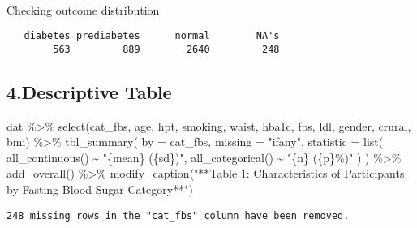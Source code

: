 \documentclass[
  letterpaper,
  DIV=11,
  numbers=noendperiod]{scrartcl}
\makeatletter
\let\oldparagraph\paragraph
\renewcommand{\paragraph}{
    \@ifstar
      \xxxParagraphStar
      \xxxParagraphNoStar
  }
\newcommand{\xxxParagraphStar}[1]{\oldparagraph*{#1}\mbox{}}
\newcommand{\xxxParagraphNoStar}[1]{\oldparagraph{#1}\mbox{}}
\newenvironment{Shaded}{\begin{snugshade}}{\end{snugshade}}
\newcommand{\AttributeTok}[1]{\textcolor[rgb]{0.40,0.45,0.13}{#1}}
\newcommand{\FunctionTok}[1]{\textcolor[rgb]{0.28,0.35,0.67}{#1}}
\newcommand{\NormalTok}[1]{\textcolor[rgb]{0.00,0.23,0.31}{#1}}
\newcommand{\SpecialCharTok}[1]{\textcolor[rgb]{0.37,0.37,0.37}{#1}}
\newcommand{\StringTok}[1]{\textcolor[rgb]{0.13,0.47,0.30}{#1}}
\makeatother
\begin{document}
\paragraph{Checking outcome
distribution}\label{checking-outcome-distribution}

\begin{Shaded}
\end{Shaded}

\begin{verbatim}
   diabetes prediabetes      normal        NA's 
        563         889        2640         248 
\end{verbatim}

\subsection{4.Descriptive Table}\label{descriptive-table}

\begin{Shaded}
\begin{Highlighting}[]
\NormalTok{dat }\SpecialCharTok{\%\textgreater{}\%}
  \FunctionTok{select}\NormalTok{(cat\_fbs, age, hpt, smoking, waist, hba1c, fbs, ldl,}
\NormalTok{         gender, crural, bmi) }\SpecialCharTok{\%\textgreater{}\%}
  \FunctionTok{tbl\_summary}\NormalTok{(}
    \AttributeTok{by =}\NormalTok{ cat\_fbs,}
    \AttributeTok{missing =} \StringTok{"ifany"}\NormalTok{,}
    \AttributeTok{statistic =} \FunctionTok{list}\NormalTok{(}
      \FunctionTok{all\_continuous}\NormalTok{() }\SpecialCharTok{\textasciitilde{}} \StringTok{"\{mean\} (\{sd\})"}\NormalTok{,}
      \FunctionTok{all\_categorical}\NormalTok{() }\SpecialCharTok{\textasciitilde{}} \StringTok{"\{n\} (\{p\}\%)"}
\NormalTok{    )}
\NormalTok{  ) }\SpecialCharTok{\%\textgreater{}\%}
  \FunctionTok{add\_overall}\NormalTok{() }\SpecialCharTok{\%\textgreater{}\%}
  \FunctionTok{modify\_caption}\NormalTok{(}\StringTok{"**Table 1: Characteristics of Participants by Fasting Blood Sugar Category**"}\NormalTok{)}
\end{Highlighting}
\end{Shaded}

\begin{verbatim}
248 missing rows in the "cat_fbs" column have been removed.
\end{verbatim}
\end{document}
